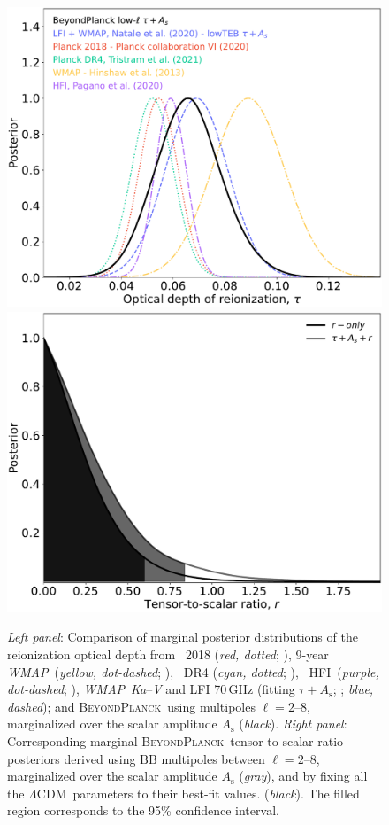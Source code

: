 \documentclass[onecolumn]{aa}
\def\WMAP{\textit{WMAP}}
\def\LCDM{$\Lambda$CDM}
\newcommand{\BP}{\textsc{BeyondPlanck}}
\newcommand{\hfi}[0]{HFI}
\begin{document}
\begin{figure}[t]
  \center
  \includegraphics[width=0.49\linewidth]{figs/BP10_tau_post.pdf} 
  \includegraphics[width=0.49\linewidth]{figs/BP10_r_post.pdf}  
  \caption{\emph{Left panel}: Comparison of marginal posterior
    distributions of the reionization optical depth from \Planck\ 2018
    (\emph{red, dotted}; \citealp{planck2016-l06}), 9-year
    \WMAP\ (\emph{yellow, dot-dashed}; \citealp{hinshaw2012}),
    \Planck\ DR4 (\emph{cyan, dotted}; \citealp{tristram:2021}),
    \Planck\ \hfi\ (\emph{purple, dot-dashed}; \citealp{pagano:2020}),
    \WMAP\ \emph{Ka}--\emph V and LFI 70\,GHz (fitting $\tau +
    A_{\mathrm s}$; \citealp{natale:2020}; \emph{blue, dashed}); and
    \BP\ using multipoles $\ell=2$--8, marginalized over the scalar
    amplitude $A_{\mathrm s}$ (\emph{black}).  \emph{Right panel}:
    Corresponding marginal \BP\ tensor-to-scalar ratio posteriors
    derived using $\mathrm{BB}$ multipoles between $\ell=2$--8,
    marginalized over the scalar amplitude $A_{\mathrm s}$
    (\emph{gray}), and by fixing all the \LCDM\ parameters to their
    best-fit values. (\emph{black}). The filled region corresponds to
    the 95\% confidence interval.}
    \label{fig:tau}
\end{figure}
\end{document}
